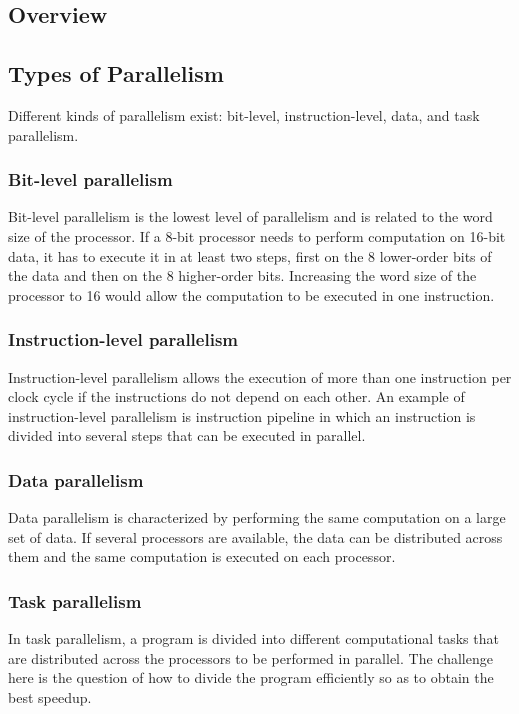 \subsection{Overview}

\subsection{Types of Parallelism}

Different kinds of parallelism exist: bit-level, instruction-level, data, and task parallelism.

\subsubsection{Bit-level parallelism}
Bit-level parallelism is the lowest level of parallelism and is related to the word size of the processor. If a 8-bit processor needs to perform computation on 16-bit data, it has to execute it in at least two steps, first on the 8 lower-order bits of the data and then on the 8 higher-order bits. Increasing the word size of the processor to 16 would allow the computation to be executed in one instruction. 

\subsubsection{Instruction-level parallelism}
Instruction-level parallelism allows the execution of more than one instruction per clock cycle if the instructions do not depend on each other. An example of instruction-level parallelism is instruction pipeline in which an instruction is divided into several steps that can be executed in parallel.

\subsubsection{Data parallelism}
Data parallelism is characterized by performing the same computation on a large set of data. If several processors are available, the data can be distributed across them and the same computation is executed on each processor.  

\subsubsection{Task parallelism}
In task parallelism, a program is divided into different computational tasks that are distributed across the processors to be performed in parallel. The challenge here is the question of how to divide the program efficiently so as to obtain the best speedup.

